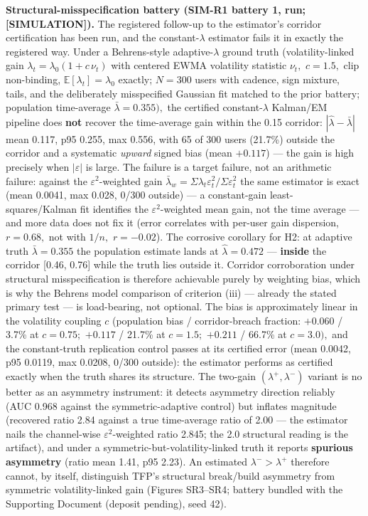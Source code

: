\documentclass[11pt,twocolumn]{article}
\theoremstyle{gttdef}
\theoremstyle{gttplain}
\begin{document}
\textbf{Structural-misspecification battery (SIM-R1 battery 1, run; [SIMULATION]).} The registered follow-up to the estimator's corridor certification has been run, and the constant-$\lambda$ estimator fails it in exactly the registered way. Under a Behrens-style adaptive-$\lambda$ ground truth (volatility-linked gain $\lambda_t = \lambda_0(1 + c\,\nu_t)$ with centered EWMA volatility statistic $\nu_t,$ $c = 1.5,$ clip non-binding, $\mathbb{E}[\lambda_t] = \lambda_0$ exactly; $N = 300$ users with cadence, sign mixture, tails, and the deliberately misspecified Gaussian fit matched to the prior battery; population time-average $\bar{\lambda} = 0.355),$ the certified constant-$\lambda$ Kalman/EM pipeline does \textbf{not} recover the time-average gain within the 0.15 corridor: $|\hat{\lambda} - \bar{\lambda}|$ mean 0.117, p95 0.255, max 0.556, with 65 of 300 users (21.7\%) outside the corridor and a systematic \emph{upward} signed bias (mean $+0.117$) --- the gain is high precisely when $|\varepsilon|$ is large. The failure is a target failure, not an arithmetic failure: against the $\varepsilon^{2}$-weighted gain $\bar{\lambda}_w = \Sigma\lambda_t\varepsilon_t^{2}/\Sigma\varepsilon_t^{2}$ the same estimator is exact (mean 0.0041, max 0.028, 0/300 outside) --- a constant-gain least-squares/Kalman fit identifies the $\varepsilon^{2}$-weighted mean gain, not the time average --- and more data does not fix it (error correlates with per-user gain dispersion, $r = 0.68,$ not with $1/n,$ $r = -0.02$). The corrosive corollary for H2: at adaptive truth $\bar{\lambda} = 0.355$ the population estimate lands at $\hat{\lambda} = 0.472$ --- \textbf{inside} the corridor [0.46, 0.76] while the truth lies outside it. Corridor corroboration under structural misspecification is therefore achievable purely by weighting bias, which is why the Behrens model comparison of criterion (iii) --- already the stated primary test --- is load-bearing, not optional. The bias is approximately linear in the volatility coupling $c$ (population bias / corridor-breach fraction: $+0.060$ / 3.7\% at $c = 0.75;$ $+0.117$ / 21.7\% at $c = 1.5;$ $+0.211$ / 66.7\% at $c = 3.0),$ and the constant-truth replication control passes at its certified error (mean 0.0042, p95 0.0119, max 0.0208, 0/300 outside): the estimator performs as certified exactly when the truth shares its structure. The two-gain $(\lambda^{+}, \lambda^{-})$ variant is no better as an asymmetry instrument: it detects asymmetry direction reliably (AUC 0.968 against the symmetric-adaptive control) but inflates magnitude (recovered ratio 2.84 against a true time-average ratio of 2.00 --- the estimator nails the channel-wise $\varepsilon^{2}$-weighted ratio 2.845; the 2.0 structural reading is the artifact), and under a symmetric-but-volatility-linked truth it reports \textbf{spurious asymmetry} (ratio mean 1.41, p95 2.23). An estimated $\lambda^{-} > \lambda^{+}$ therefore cannot, by itself, distinguish TFP's structural break/build asymmetry from symmetric volatility-linked gain (Figures SR3--SR4; battery bundled with the Supporting Document (deposit pending), seed 42).
\end{document}
